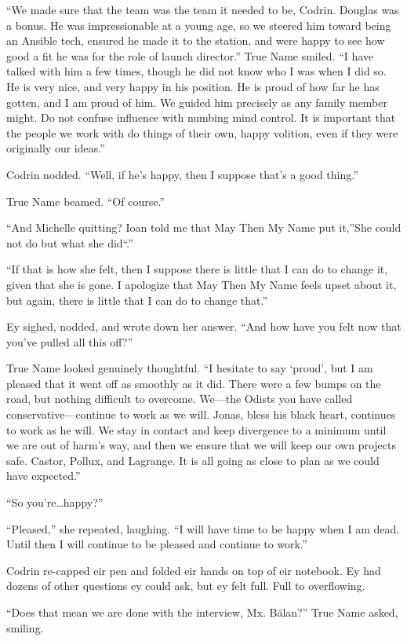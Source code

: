 ``We made sure that the team was the team it needed to be, Codrin. Douglas was a bonus. He was impressionable at a young age, so we steered him toward being an Ansible tech, ensured he made it to the station, and were happy to see how good a fit he was for the role of launch director.'' True Name smiled. ``I have talked with him a few times, though he did not know who I was when I did so. He is very nice, and very happy in his position. He is proud of how far he has gotten, and I am proud of him. We guided him precisely as any family member might. Do not confuse influence with numbing mind control. It is important that the people we work with do things of their own, happy volition, even if they were originally our ideas.''

Codrin nodded. ``Well, if he's happy, then I suppose that's a good thing.''

True Name beamed. ``Of course.''

``And Michelle quitting? Ioan told me that May Then My Name put it,''She could not do but what she did``.''

``If that is how she felt, then I suppose there is little that I can do to change it, given that she is gone. I apologize that May Then My Name feels upset about it, but again, there is little that I can do to change that.''

Ey sighed, nodded, and wrote down her answer. ``And how have you felt now that you've pulled all this off?''

True Name looked genuinely thoughtful. ``I hesitate to say `proud', but I am pleased that it went off as smoothly as it did. There were a few bumps on the road, but nothing difficult to overcome. We---the Odists you have called conservative---continue to work as we will. Jonas, bless his black heart, continues to work as he will. We stay in contact and keep divergence to a minimum until we are out of harm's way, and then we ensure that we will keep our own projects safe. Castor, Pollux, and Lagrange. It is all going as close to plan as we could have expected.''

``So you're\ldots happy?''

``Pleased,'' she repeated, laughing. ``I will have time to be happy when I am dead. Until then I will continue to be pleased and continue to work.''

Codrin re-capped eir pen and folded eir hands on top of eir notebook. Ey had dozens of other questions ey could ask, but ey felt full. Full to overflowing.

``Does that mean we are done with the interview, Mx. Bălan?'' True Name asked, smiling.

